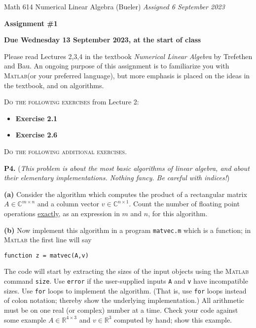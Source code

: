 \documentclass[12pt]{amsart}
\newcommand{\CC}{\mathbb{C}}
\newcommand{\RR}{\mathbb{R}}
\newcommand{\prob}[1]{\bigskip\noindent\textbf{#1.}\quad }
\newcommand{\epart}[1]{\medskip\noindent\textbf{(#1)}\quad }
\newcommand{\Matlab}{\textsc{Matlab}\xspace}
\begin{document}
\scriptsize \noindent Math 614 Numerical Linear Algebra (Bueler) \hfill \emph{Assigned 6 September 2023}
\normalsize\medskip

\Large\centerline{\textbf{Assignment \#1}}
\large
\medskip

\centerline{\textbf{Due Wednesday 13 September 2023, at the start of class}}
\medskip
\normalsize

\thispagestyle{empty}

\bigskip
\noindent Please read Lectures 2,3,4 in the textbook \emph{Numerical Linear Algebra} by Trefethen and Bau.  An ongoing purpose of this assignment is to familiarize you with \Matlab (or your preferred language), but more emphasis is placed on the ideas in the textbook, and on algorithms.

\bigskip
\noindent \textsc{Do the following exercises} from Lecture 2:

\begin{itemize}
\item \textbf{Exercise 2.1}
\item \textbf{Exercise 2.6}
\end{itemize}


\bigskip
\noindent \textsc{Do the following additional exercises.}

\prob{P4}  (\emph{This problem is about the most basic algorithms of linear algebra, and about their elementary implementations.  Nothing fancy.  Be careful with indices!})

\epart{a}  Consider the algorithm which computes the product of a rectangular matrix $A\in \CC^{m\times n}$ and a column vector $v \in \CC^{n\times 1}$.  Count the number of floating point operations \underline{exactly}, as an expression in $m$ and $n$, for this algorithm.

\epart{b}  Now implement this algorithm in a program \texttt{matvec.m} which is a function; in \Matlab the first line will say

\texttt{function z = matvec(A,v)}

\noindent The code will start by extracting the sizes of the input objects using the \Matlab command \texttt{size}.  Use \texttt{error} if the user-supplied inputs \texttt{A} and \texttt{v} have incompatible sizes.  Use \texttt{for} loops to implement the algorithm.  (That is, use \texttt{for} loops instead of colon notation; thereby show the underlying implementation.)  All arithmetic must be on one real (or complex) number at a time.  Check your code against some example $A\in \RR^{4\times 3}$ and $v\in \RR^3$ computed by hand; show this example.
\end{document}

